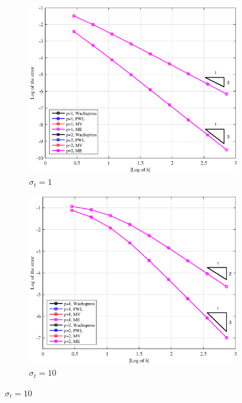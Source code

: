 \begin{figure}
\centering
{
	\begin{subfigure}[b]{0.485\textwidth}
		\centering
		\label{subfig::PA_Left_Tri_sig1}
		\includegraphics[width=\textwidth]{figures/sec_BF/PAErr_Left_Tri_sig1.eps}
	\caption{$\sigma_t = 1$}
	\end{subfigure}
	\hfill
	\begin{subfigure}[b]{0.485\textwidth}
		\centering
		\label{subfig::PA_Left_Tri_sig10}
		\includegraphics[width=\textwidth]{figures/sec_BF/PAErr_Left_Tri_sig10.eps}
	\caption{$\sigma_t = 10$}
	\end{subfigure}
}
\end{figure}
